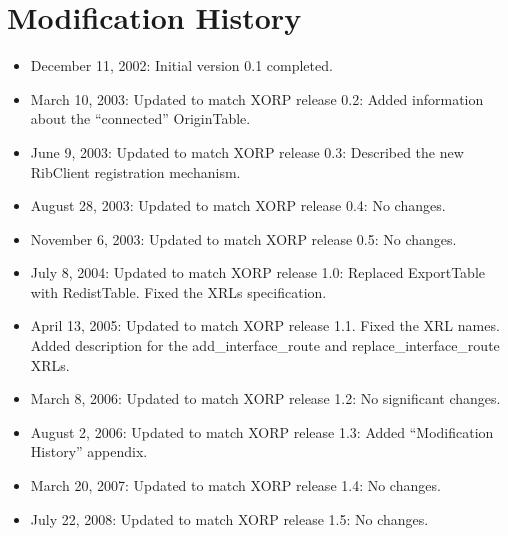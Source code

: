 \documentclass[11pt]{article}
\begin{document}
\section{Modification History}

\begin{itemize}

  \item December 11, 2002: Initial version 0.1 completed.

  \item March 10, 2003: Updated to match XORP release 0.2:
   Added information about the ``connected'' OriginTable.

  \item June 9, 2003: Updated to match XORP release 0.3:
   Described the new RibClient registration mechanism.

  \item August 28, 2003: Updated to match XORP release 0.4:
   No changes.

  \item November 6, 2003: Updated to match XORP release 0.5:
   No changes.

  \item July 8, 2004: Updated to match XORP release 1.0:
   Replaced ExportTable with RedistTable. Fixed the XRLs specification.

  \item April 13, 2005: Updated to match XORP release 1.1.
   Fixed the XRL names. Added description for the add\_interface\_route and
   replace\_interface\_route XRLs.

  \item March 8, 2006: Updated to match XORP release 1.2:
   No significant changes.

  \item August 2, 2006: Updated to match XORP release 1.3:
   Added ``Modification History'' appendix.

  \item March 20, 2007: Updated to match XORP release 1.4:
   No changes.

  \item July 22, 2008: Updated to match XORP release 1.5:
   No changes.

\end{itemize}

%
%

\end{document}
